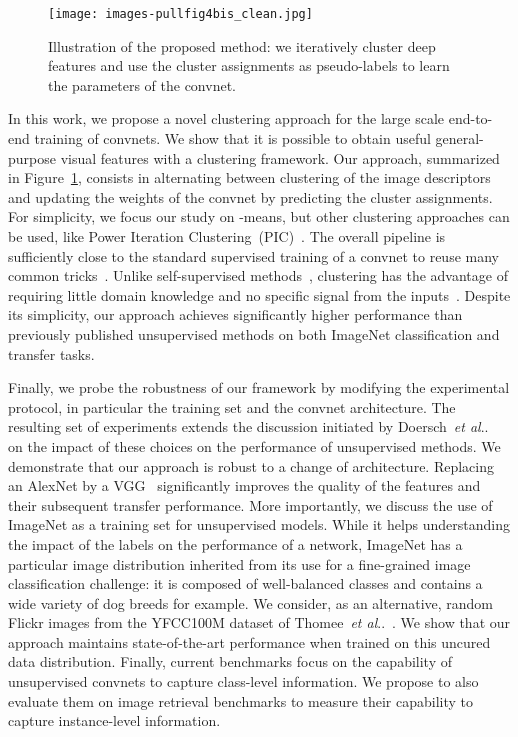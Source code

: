\documentclass[runningheads]{llncs}
\makeatletter
\DeclareRobustCommand\onedot{\futurelet\@let@token\@onedot}
\def\@onedot{\ifx\@let@token.\else.\null\fi\xspace}
\def\etal{\emph{et al}\onedot}
\makeatother
\begin{document}
\begin{figure}[!t]
  \centering
  \texttt{[image: images-pullfig4bis\_clean.jpg]}
  \caption{
    Illustration of the proposed method: we iteratively cluster deep features and use the cluster assignments as pseudo-labels to learn the parameters of the convnet.
  }
  \label{fig:pullfig}
\end{figure}

In this work, we propose a novel clustering approach for the large scale
end-to-end training of convnets.  We show that it is possible to obtain useful
general-purpose visual features with a clustering framework.  Our approach,
summarized in Figure~\ref{fig:pullfig}, consists in alternating between
clustering of the image descriptors and updating the weights of the convnet by
predicting the cluster assignments.  For simplicity, we focus our study on
-means, but other clustering approaches can be used, like Power Iteration
Clustering~(PIC)~\cite{lin2010power}.  The overall pipeline is sufficiently
close to the standard supervised training of a convnet to reuse many common
tricks~\cite{ioffe2015batch}.  Unlike self-supervised
methods~\cite{doersch2015unsupervised,noroozi2016unsupervised,pathak2016learning},
clustering has the advantage of requiring little domain knowledge and no specific
signal from the
inputs~\cite{zhang2016colorful,wang2015unsupervised}.  Despite its simplicity,
our approach achieves significantly higher performance than previously
published unsupervised methods on both ImageNet classification and transfer tasks.

Finally, we probe the robustness of our framework by modifying the experimental protocol,
in particular the training set and the convnet architecture. The resulting set of experiments extends the
discussion initiated by Doersch~\etal~\cite{doersch2015unsupervised} on the impact of these choices on
the performance of unsupervised methods.
We demonstrate that our
approach is robust to a change of architecture.
Replacing an AlexNet by a
VGG~\cite{simonyan2014very} significantly improves the quality of the features
and their subsequent transfer performance.  More importantly, we discuss
the use of ImageNet as a training set for unsupervised models.  While it helps
understanding the impact of the labels on the performance of a network,
ImageNet has a particular image distribution inherited from its use for a
fine-grained image classification challenge: it is composed of well-balanced classes and contains
a wide variety of dog breeds for example.  We consider, as an alternative, random Flickr
images from the YFCC100M dataset of Thomee~\etal~\cite{thomee2015new}.  We show
that our approach maintains state-of-the-art performance when trained on this
uncured data distribution.  Finally,  current benchmarks focus on
the capability of unsupervised convnets to capture class-level
information.  We propose to also evaluate them on image retrieval
benchmarks to measure their capability to capture instance-level
information.
\end{document}
